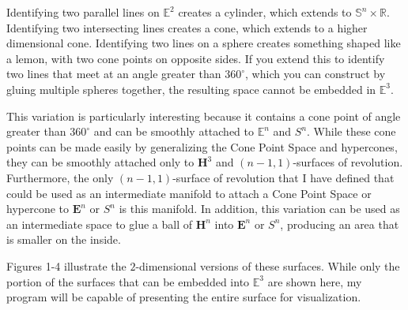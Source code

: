 \documentclass[12pt]{amsart}
\begin{document}
Identifying two parallel lines on $\mathbb{E}^2$ creates a cylinder, which extends to $\mathbb{S}^n \times \mathbb{R}$. Identifying two intersecting lines creates a cone, which extends to a higher dimensional cone. Identifying two lines on a sphere creates something shaped like a lemon, with two cone points on opposite sides. If you extend this to identify two lines that meet at an angle greater than $360^\circ$, which you can construct by gluing multiple spheres together, the resulting space cannot be embedded in $\mathbb{E}^3$.

This variation is particularly interesting because it contains a cone point of angle greater than $360^\circ$ and can be smoothly attached to $\mathbb{E}^n$ and $S^n$. While these cone points can be made easily by generalizing the Cone Point Space and hypercones, they can be smoothly attached only to $\textbf{H}^3$ and $(n-1,1)$-surfaces of revolution. Furthermore, the only $(n-1,1)$-surface of revolution that I have defined that could be used as an intermediate manifold to attach a Cone Point Space or hypercone to $\textbf{E}^n$ or $S^n$ is this manifold. In addition, this variation can be used as an intermediate space to glue a ball of $\textbf{H}^n$ into $\textbf{E}^n$ or $S^n$, producing an area that is smaller on the inside.

Figures 1-4 illustrate the $2$-dimensional versions of these surfaces. While only the portion of the surfaces that can be embedded into $\mathbb{E}^3$ are shown here, my program will be capable of presenting the entire surface for visualization.
\end{document}
